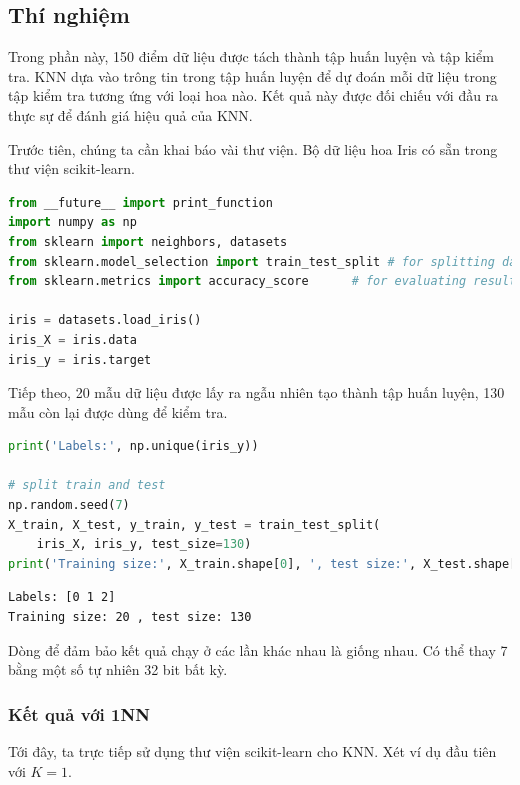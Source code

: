 


\subsection{Thí nghiệm}


Trong phần này, 150 điểm dữ liệu được tách thành tập huấn luyện và tập kiểm tra.
KNN dựa vào trông tin trong tập huấn luyện để dự đoán mỗi dữ liệu trong tập kiểm
tra tương ứng với loại hoa nào. Kết quả này được đối chiếu với đầu ra thực sự
để đánh giá hiệu quả của KNN.

Trước tiên, chúng ta cần khai báo vài thư viện. Bộ dữ liệu hoa Iris có sẵn trong
thư viện scikit-learn.

\begin{lstlisting}[language=Python]
from __future__ import print_function
import numpy as np
from sklearn import neighbors, datasets
from sklearn.model_selection import train_test_split # for splitting data
from sklearn.metrics import accuracy_score      # for evaluating results

iris = datasets.load_iris()
iris_X = iris.data
iris_y = iris.target
\end{lstlisting}

Tiếp theo, 20 mẫu dữ liệu được lấy ra ngẫu nhiên tạo thành tập huấn luyện, 130 mẫu còn lại được dùng để kiểm tra.

\begin{lstlisting}[language=Python]
print('Labels:', np.unique(iris_y))

# split train and test
np.random.seed(7)
X_train, X_test, y_train, y_test = train_test_split(
    iris_X, iris_y, test_size=130)
print('Training size:', X_train.shape[0], ', test size:', X_test.shape[0])
\end{lstlisting}
\begin{lstlisting}
Labels: [0 1 2]
Training size: 20 , test size: 130
\end{lstlisting}

Dòng  để đảm bảo kết quả chạy ở các lần khác nhau là giống nhau. Có thể thay 7 bằng một số tự
nhiên 32 bit bất kỳ.

\subsubsection{Kết quả với 1NN}
Tới đây, ta trực tiếp sử dụng thư viện scikit-learn cho KNN. Xét ví dụ đầu tiên
với $K = 1$.

